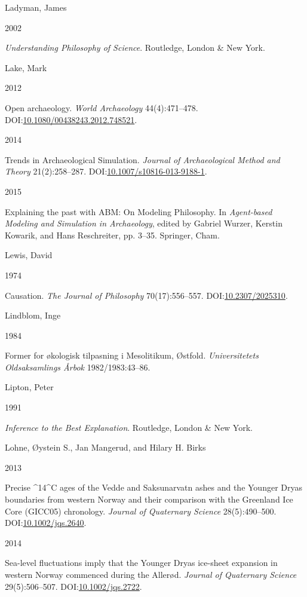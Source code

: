 \documentclass[
  a4paper,
  oneside]{uiophdthesis}
\newlength{\cslhangindent}
\newlength{\csllabelwidth}
\newlength{\cslentryspacingunit} %
\newenvironment{CSLReferences}[2] %
 {%
  \setlength{\parindent}{0pt}
  \ifodd #1
  \let\oldpar\par
  \def\par{\hangindent=\cslhangindent\oldpar}
  \fi
  \setlength{\parskip}{#2\cslentryspacingunit}
 }%
 {}
\newcommand{\CSLBlock}[1]{#1\hfill\break}
\newcommand{\CSLLeftMargin}[1]{\parbox[t]{\csllabelwidth}{#1}}
\newcommand{\CSLRightInline}[1]{\parbox[t]{\linewidth - \csllabelwidth}{#1}\break}
\begin{document}
\begin{CSLReferences}{0}{0}
\leavevmode{}%
\CSLBlock{Ladyman, James}
\CSLLeftMargin{ 2002}
\CSLRightInline{\emph{{Understanding Philosophy of Science}}. Routledge, London \& New York.}

\leavevmode{}%
\CSLBlock{Lake, Mark}
\CSLLeftMargin{ 2012}
\CSLRightInline{{Open archaeology}. \emph{World Archaeology} 44(4):471--478. DOI:\href{https://doi.org/10.1080/00438243.2012.748521}{10.1080/00438243.2012.748521}.}

\leavevmode{}%
\CSLLeftMargin{ 2014 }
\CSLRightInline{{Trends in Archaeological Simulation}. \emph{Journal of Archaeological Method and Theory} 21(2):258--287. DOI:\href{https://doi.org/10.1007/s10816-013-9188-1}{10.1007/s10816-013-9188-1}.}

\leavevmode{}%
\CSLLeftMargin{ 2015 }
\CSLRightInline{{Explaining the past with ABM: On Modeling Philosophy}. In \emph{{Agent-based Modeling and Simulation in Archaeology}}, edited by Gabriel Wurzer, Kerstin Kowarik, and Hans Reschreiter, pp. 3--35. Springer, Cham.}

\leavevmode{}%
\CSLBlock{Lewis, David}
\CSLLeftMargin{ 1974}
\CSLRightInline{Causation. \emph{The Journal of Philosophy} 70(17):556--557. DOI:\href{https://doi.org/10.2307/2025310}{10.2307/2025310}.}

\leavevmode{}%
\CSLBlock{Lindblom, Inge}
\CSLLeftMargin{ 1984}
\CSLRightInline{{Former for økologisk tilpasning i Mesolitikum, Østfold}. \emph{Universitetets Oldsaksamlings Årbok} 1982/1983:43--86.}

\leavevmode{}%
\CSLBlock{Lipton, Peter}
\CSLLeftMargin{ 1991}
\CSLRightInline{\emph{{Inference to the Best Explanation}}. Routledge, London \& New York.}

\leavevmode{}%
\CSLBlock{Lohne, Øystein S., Jan Mangerud, and Hilary H. Birks}
\CSLLeftMargin{ 2013}
\CSLRightInline{{Precise \^{}14\^{}C ages of the Vedde and Saksunarvatn ashes and the Younger Dryas boundaries from western Norway and their comparison with the Greenland Ice Core (GICC05) chronology}. \emph{Journal of Quaternary Science} 28(5):490--500. DOI:\href{https://doi.org/10.1002/jqs.2640}{10.1002/jqs.2640}.}

\leavevmode{}%
\CSLLeftMargin{ 2014 }
\CSLRightInline{{Sea-level fluctuations imply that the Younger Dryas ice-sheet expansion in western Norway commenced during the Allerød}. \emph{Journal of Quaternary Science} 29(5):506--507. DOI:\href{https://doi.org/10.1002/jqs.2722}{10.1002/jqs.2722}.}


\end{CSLReferences}
\end{document}
